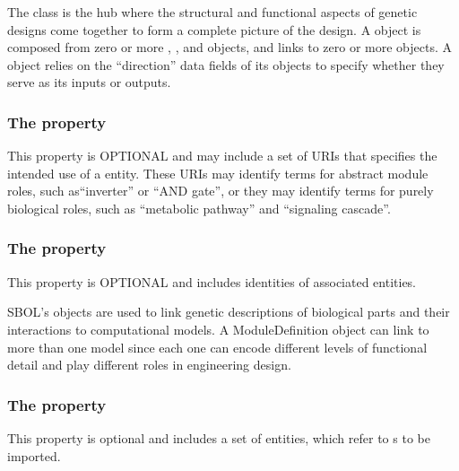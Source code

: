 The  class is the hub where the structural and functional aspects of genetic designs come together to form a complete picture of the design. 
A  object is composed from zero or more , , and  objects, and links to zero or more  objects. 
A  object relies on the ``direction'' data fields of its  objects to specify whether they serve as its inputs or outputs.

\subsubsection*{The  property}
This property is OPTIONAL and may include a set of URIs that specifies the intended use of a  entity. 
These URIs may identify terms for abstract module roles, such as``inverter'' or ``AND gate'', or they may identify terms for purely biological roles, such as ``metabolic pathway'' and ``signaling cascade''.

\subsubsection*{The  property}
This property is OPTIONAL and includes identities of associated  entities.

SBOL's  objects are used to link genetic descriptions of biological parts and their interactions to computational models.
A ModuleDefinition object can link to more than one model since each one can encode different levels of functional detail and play different roles in engineering design. 


\subsubsection*{The  property}
This property is optional and includes a set of  entities, which refer to s to be imported.

